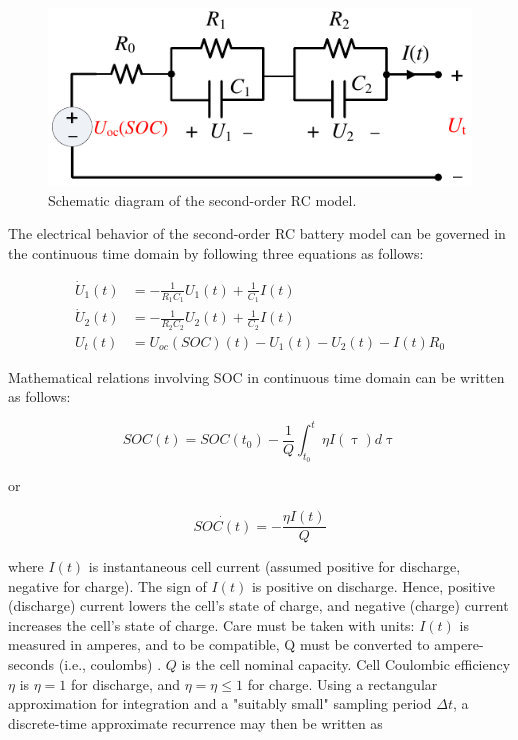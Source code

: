 \documentclass[12pt]{article}
\begin{document}
\begin{figure}[b!]
	\centering
	\includegraphics[height=0.20\textwidth, keepaspectratio]{images/Schematic_diagram_of_the_second_order_RC_model.pdf}
	\caption{Schematic diagram of the second-order RC model.}
	\label{fig:Schematic_diagram_of_the_second_order_RC_model}
\end{figure}

\par \noindent The electrical behavior of the second-order RC battery model can
be governed in the continuous time domain by following three equations as follows:

\begin{subequations} 
	\label{eqn:electrical_behavior_of_the_proposed_model}
	\begin{align} \dot{U}_{1}(t) &= -\frac{1}{R_{1}C_{1}}U_1(t) + \frac{1}{C_1}I(t) \\ 
	\dot{U}_{2}(t) &= -\frac{1}{R_{2}C_{2}}U_2(t) + \frac{1}{C_2}I(t) \\ 
		U_{t}(t) &= U_{oc}(SOC)(t) - {U}_{1}(t) - {U}_{2}(t) - I(t)R_{0} 
	\end{align} 
\end{subequations}

\par \noindent Mathematical relations involving SOC in continuous time domain can be written as follows:

\begin{equation}
	\label{eqn:SOC_in_continious_time}
	SOC(t) = SOC(t_{0}) - \frac{1}{Q}\int_{t_{0}}^{t}\eta I(\uptau)d\uptau
\end{equation}

\noindent or 

\begin{equation}
	\label{eqn:SOC_in_continious_time_without_integral}
	\dot{SOC(t)} = -\frac{\eta I(t)}{Q}
\end{equation}

\noindent where $I(t)$ is instantaneous cell current (assumed positive for discharge, negative for charge). The sign of $I(t)$ is positive on discharge. Hence, positive (discharge) current lowers the cell’s state of charge, and negative (charge) current increases the cell’s state of charge. Care must be taken with units: $I(t)$ is measured in amperes, and to be compatible, Q must be converted to ampere-seconds (i.e., coulombs) \cite{Plett2015}. $Q$ is the cell nominal capacity. Cell Coulombic efficiency $\eta$ is $\eta=1$ for discharge, and $\eta = \eta \leq 1 $  for charge. Using a rectangular approximation for integration and a "suitably small" sampling period $\Delta{t}$, a discrete-time approximate recurrence may then be written as
\end{document}
